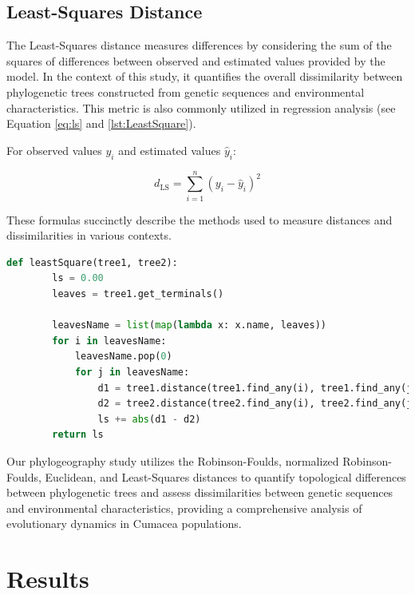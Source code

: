 \subsection{Least-Squares Distance}\label{LS}
The Least-Squares distance measures differences by considering the sum of the squares of differences between observed and estimated values provided by the model. In the context of this study, it quantifies the overall dissimilarity between phylogenetic trees constructed from genetic sequences and environmental characteristics. This metric is also commonly utilized in regression analysis (see Equation \eqref{eq:ls} and \autoref{lst:LeastSquare}).

For observed values $y_i$ and estimated values $\hat{y}_i$:

\begin{equation}\label{eq:ls}
    d_{\text{LS}} = \sum_{i=1}^{n} (y_i - \hat{y}_i)^2
\end{equation}

These formulas succinctly describe the methods used to measure distances and dissimilarities in various contexts.

\begin{lstlisting}[label=lst:LeastSquare,language=Python,caption=Python script for calculating the Least-Square distance using the ete3 package in the \textit{aPhyloGeo} package]
    def leastSquare(tree1, tree2):
        ls = 0.00
        leaves = tree1.get_terminals()

        leavesName = list(map(lambda x: x.name, leaves))
        for i in leavesName:
            leavesName.pop(0)
            for j in leavesName:
                d1 = tree1.distance(tree1.find_any(i), tree1.find_any(j))
                d2 = tree2.distance(tree2.find_any(i), tree2.find_any(j))
                ls += abs(d1 - d2)
        return ls
\end{lstlisting}

Our phylogeography study utilizes the Robinson-Foulds, normalized Robinson-Foulds, Euclidean, and Least-Squares distances to quantify topological differences between phylogenetic trees and assess dissimilarities between genetic sequences and environmental characteristics, providing a comprehensive analysis of evolutionary dynamics in Cumacea populations.

\section{Results}\label{results}

